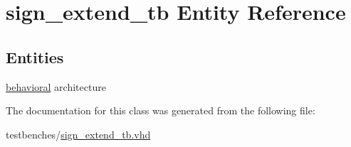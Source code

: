 \hypertarget{classsign__extend__tb}{\section{sign\-\_\-extend\-\_\-tb \-Entity \-Reference}
\label{classsign__extend__tb}
}
\subsection*{\-Entities}
\begin{DoxyCompactItemize}
\item 
\hyperlink{classsign__extend__tb_1_1behavioral}{behavioral} architecture
\end{DoxyCompactItemize}


\-The documentation for this class was generated from the following file\-:\begin{DoxyCompactItemize}
\item 
testbenches/\hyperlink{sign__extend__tb_8vhd}{sign\-\_\-extend\-\_\-tb.\-vhd}\end{DoxyCompactItemize}
